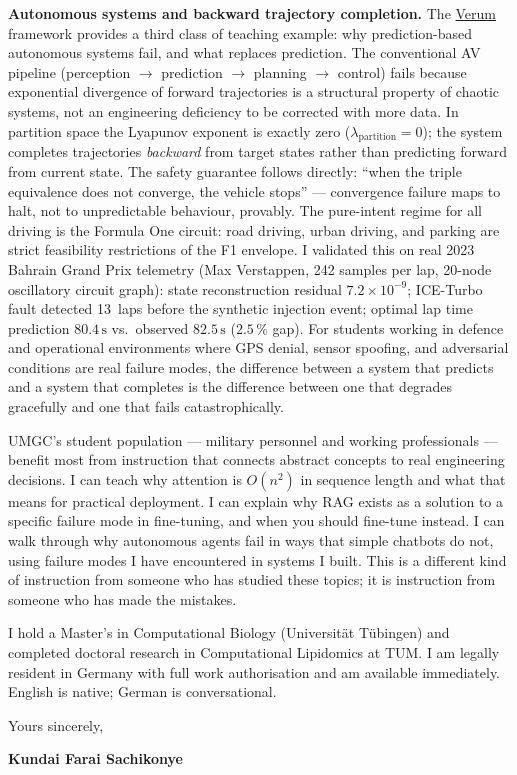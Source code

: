 \documentclass[12pt,a4paper]{article}
\begin{document}
\textbf{Autonomous systems and backward trajectory completion.}
The \href{https://github.com/fullscreen-triangle/verum}{Verum} framework
provides a third class of teaching example: why prediction-based autonomous
systems fail, and what replaces prediction. The conventional AV pipeline
(perception $\to$ prediction $\to$ planning $\to$ control) fails because
exponential divergence of forward trajectories is a structural property of
chaotic systems, not an engineering deficiency to be corrected with more
data. In partition space the Lyapunov exponent is exactly zero ($\lambda_\mathrm{partition} = 0$);
the system completes trajectories \emph{backward} from target states rather
than predicting forward from current state. The safety guarantee follows
directly: ``when the triple equivalence does not converge, the vehicle stops''
--- convergence failure maps to halt, not to unpredictable behaviour, provably.
The pure-intent regime for all driving is the Formula One circuit: road
driving, urban driving, and parking are strict feasibility restrictions of
the F1 envelope. I validated this on real 2023 Bahrain Grand Prix telemetry
(Max Verstappen, 242 samples per lap, 20-node oscillatory circuit graph):
state reconstruction residual $7.2 \times 10^{-9}$; ICE-Turbo fault
detected 13~laps before the synthetic injection event; optimal lap time
prediction $80.4\,\mathrm{s}$ vs.\ observed $82.5\,\mathrm{s}$
($2.5\,\%$ gap).
For students working in defence and operational environments where GPS
denial, sensor spoofing, and adversarial conditions are real failure modes,
the difference between a system that predicts and a system that completes
is the difference between one that degrades gracefully and one that
fails catastrophically.

UMGC's student population --- military personnel and working professionals --- benefit
most from instruction that connects abstract concepts to real engineering decisions.
I can teach why attention is $O(n^2)$ in sequence length and what that means for
practical deployment. I can explain why RAG exists as a solution to a specific failure
mode in fine-tuning, and when you should fine-tune instead. I can walk through why
autonomous agents fail in ways that simple chatbots do not, using failure modes I have
encountered in systems I built. This is a different kind of instruction from someone
who has studied these topics; it is instruction from someone who has made the mistakes.

I hold a Master's in Computational Biology (Universität Tübingen) and completed doctoral
research in Computational Lipidomics at TUM. I am legally resident in Germany with full
work authorisation and am available immediately. English is native; German is conversational.

\vspace{1.5em}
Yours sincerely,

\vspace{2.5em}
\textbf{Kundai Farai Sachikonye}
\end{document}
